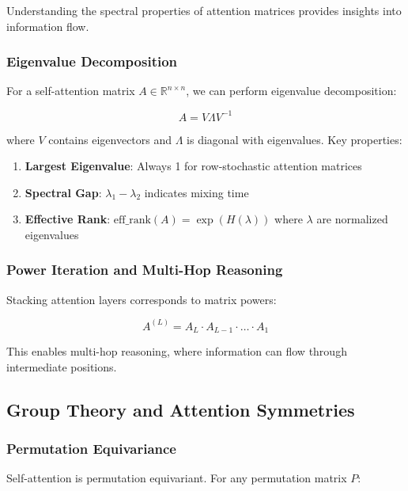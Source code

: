 \documentclass[11pt]{article}
\begin{document}
Understanding the spectral properties of attention matrices provides insights into information flow.

\subsubsection{Eigenvalue Decomposition}

For a self-attention matrix $A \in \mathbb{R}^{n \times n}$, we can perform eigenvalue decomposition:

\begin{equation}
A = V \Lambda V^{-1}
\end{equation}

where $V$ contains eigenvectors and $\Lambda$ is diagonal with eigenvalues. Key properties:

\begin{enumerate}
    \item \textbf{Largest Eigenvalue}: Always 1 for row-stochastic attention matrices
    \item \textbf{Spectral Gap}: $\lambda_1 - \lambda_2$ indicates mixing time
    \item \textbf{Effective Rank}: $\text{eff\_rank}(A) = \exp(H(\lambda))$ where $\lambda$ are normalized eigenvalues
\end{enumerate}

\subsubsection{Power Iteration and Multi-Hop Reasoning}

Stacking attention layers corresponds to matrix powers:

\begin{equation}
A^{(L)} = A_L \cdot A_{L-1} \cdot \ldots \cdot A_1
\end{equation}

This enables multi-hop reasoning, where information can flow through intermediate positions.

\subsection{Group Theory and Attention Symmetries}

\subsubsection{Permutation Equivariance}

Self-attention is permutation equivariant. For any permutation matrix $P$:
\end{document}
